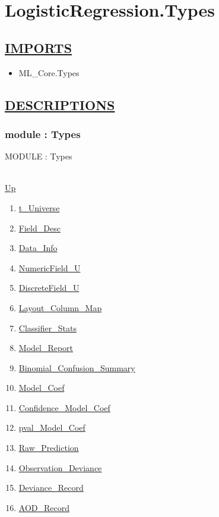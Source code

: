 \chapter*{LogisticRegression.Types}
\hypertarget{LogisticRegression.Types}{}

\section*{\underline{IMPORTS}}
\begin{itemize}
\item ML\_Core.Types
\end{itemize}

\section*{\underline{DESCRIPTIONS}}
\subsection*{module : Types}
\hypertarget{ecldoc:LogisticRegression.Types}{MODULE : Types} \\
\hyperlink{ecldoc:}{Up} \\
\par
\begin{enumerate}
\item \hyperlink{ecldoc:logisticregression.types.t_universe}{t\_Universe}
\item \hyperlink{ecldoc:logisticregression.types.field_desc}{Field\_Desc}
\item \hyperlink{ecldoc:logisticregression.types.data_info}{Data\_Info}
\item \hyperlink{ecldoc:logisticregression.types.numericfield_u}{NumericField\_U}
\item \hyperlink{ecldoc:logisticregression.types.discretefield_u}{DiscreteField\_U}
\item \hyperlink{ecldoc:logisticregression.types.layout_column_map}{Layout\_Column\_Map}
\item \hyperlink{ecldoc:logisticregression.types.classifier_stats}{Classifier\_Stats}
\item \hyperlink{ecldoc:logisticregression.types.model_report}{Model\_Report}
\item \hyperlink{ecldoc:logisticregression.types.binomial_confusion_summary}{Binomial\_Confusion\_Summary}
\item \hyperlink{ecldoc:logisticregression.types.model_coef}{Model\_Coef}
\item \hyperlink{ecldoc:logisticregression.types.confidence_model_coef}{Confidence\_Model\_Coef}
\item \hyperlink{ecldoc:logisticregression.types.pval_model_coef}{pval\_Model\_Coef}
\item \hyperlink{ecldoc:logisticregression.types.raw_prediction}{Raw\_Prediction}
\item \hyperlink{ecldoc:logisticregression.types.observation_deviance}{Observation\_Deviance}
\item \hyperlink{ecldoc:logisticregression.types.deviance_record}{Deviance\_Record}
\item \hyperlink{ecldoc:logisticregression.types.aod_record}{AOD\_Record}
\end{enumerate}
